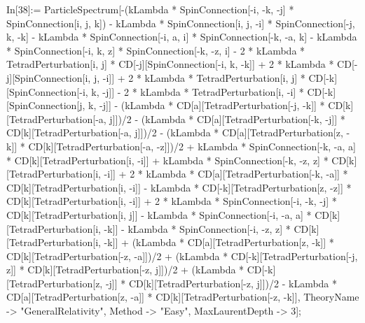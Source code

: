 In[38]:= ParticleSpectrum[-(kLambda * SpinConnection[-i, -k, -j] * SpinConnection[i, j, k]) - kLambda * SpinConnection[i, j, -i] * SpinConnection[-j, k, -k] - kLambda * SpinConnection[-i, a, i] * SpinConnection[-k, -a, k] - kLambda * SpinConnection[-i, k, z] * SpinConnection[-k, -z, i] - 2 * kLambda * TetradPerturbation[i, j] * CD[-j][SpinConnection[-i, k, -k]] + 2 * kLambda * CD[-j][SpinConnection[i, j, -i]] + 2 * kLambda * TetradPerturbation[i, j] * CD[-k][SpinConnection[-i, k, -j]] - 2 * kLambda * TetradPerturbation[i, -i] * CD[-k][SpinConnection[j, k, -j]] - (kLambda * CD[a][TetradPerturbation[-j, -k]] * CD[k][TetradPerturbation[-a, j]])/2 - (kLambda * CD[a][TetradPerturbation[-k, -j]] * CD[k][TetradPerturbation[-a, j]])/2 - (kLambda * CD[a][TetradPerturbation[z, -k]] * CD[k][TetradPerturbation[-a, -z]])/2 + kLambda * SpinConnection[-k, -a, a] * CD[k][TetradPerturbation[i, -i]] + kLambda * SpinConnection[-k, -z, z] * CD[k][TetradPerturbation[i, -i]] + 2 * kLambda * CD[a][TetradPerturbation[-k, -a]] * CD[k][TetradPerturbation[i, -i]] - kLambda * CD[-k][TetradPerturbation[z, -z]] * CD[k][TetradPerturbation[i, -i]] + 2 * kLambda * SpinConnection[-i, -k, -j] * CD[k][TetradPerturbation[i, j]] - kLambda * SpinConnection[-i, -a, a] * CD[k][TetradPerturbation[i, -k]] - kLambda * SpinConnection[-i, -z, z] * CD[k][TetradPerturbation[i, -k]] + (kLambda * CD[a][TetradPerturbation[z, -k]] * CD[k][TetradPerturbation[-z, -a]])/2 + (kLambda * CD[-k][TetradPerturbation[-j, z]] * CD[k][TetradPerturbation[-z, j]])/2 + (kLambda * CD[-k][TetradPerturbation[z, -j]] * CD[k][TetradPerturbation[-z, j]])/2 - kLambda * CD[a][TetradPerturbation[z, -a]] * CD[k][TetradPerturbation[-z, -k]], TheoryName -> "GeneralRelativity", Method -> "Easy", MaxLaurentDepth -> 3]; 